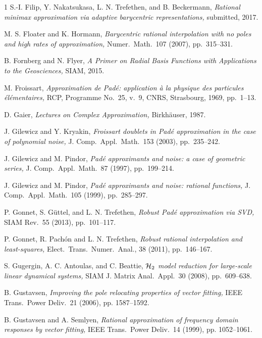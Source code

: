 \documentclass[final]{siamltex}
\begin{document}
\begin{thebibliography}{1}
{\sc S.-I. Filip, Y. Nakatsukasa, L. N. Trefethen, and 
B. Beckermann,} {\em Rational minimax approximation via
adaptive barycentric representations,} submitted, 2017.

{\sc M. S. Floater and K. Hormann,}
{\em Barycentric rational interpolation with no poles
and high rates of approximation,}
Numer.\ Math.\ 107 (2007), pp.~315--331.

{\sc B. Fornberg and N. Flyer,}
{\em A Primer on Radial Basis Functions with
Applications to the Geosciences,}
SIAM, 2015.

{\sc M. Froissart,} {\em Approximation de Pad\'e:
application \`a la physique des
particules \'el\'ementaires,} RCP, Programme No.~25, v.~9,
CNRS, Strasbourg, 1969, pp.~1--13.

{\sc D. Gaier,}
{\em Lectures on Complex Approximation,}
Birkh\"auser, 1987.

{\sc J. Gilewicz and Y. Kryakin,} {\em Froissart doublets
in Pad\'e approximation in the case of polynomial noise,}
J. Comp.\ Appl.\ Math.\ 153 (2003), pp.~235--242.

{\sc J. Gilewicz and M. Pindor,} {\em Pad\'e approximants
and noise: a case of geometric series,} J. Comp.\ Appl.\ Math.\ 87
(1997), pp.~199--214.

{\sc J. Gilewicz and M. Pindor,} {\em Pad\'e approximants
and noise: rational functions,} J. Comp.\ Appl.\ Math.\ 105 
(1999), pp.~285--297.

{\sc P. Gonnet, S. G\"uttel, and L. N. Trefethen,} {\em Robust Pad\'e
approximation via SVD,} SIAM Rev.\ 55 (2013), pp.~101--117.

{\sc P. Gonnet, R. Pach\'on and L. N. Trefethen,} {\em Robust rational
interpolation and least-squares,} Elect.\ Trans.\ Numer.\ Anal., 38
(2011), pp.~146--167.

{\sc S. Gugergin, A. C. Antoulas, and C. Beattie,}
{\em ${\cal H}_2$ model reduction for large-scale linear
dynamical systems,}
SIAM J. Matrix Anal.\ Appl.\ 30 (2008), pp.~609--638.

{\sc B. Gustavsen,} 
{\em Improving the pole relocating properties of
vector fitting,}
IEEE Trans.\ Power Deliv.\ 21 (2006), pp. 1587--1592.

{\sc B. Gustavsen and A. Semlyen,} 
{\em Rational approximation of frequency domain responses by
vector fitting,}
IEEE Trans.\ Power Deliv.\ 14 (1999), pp. 1052--1061.


\end{thebibliography}
\end{document}
